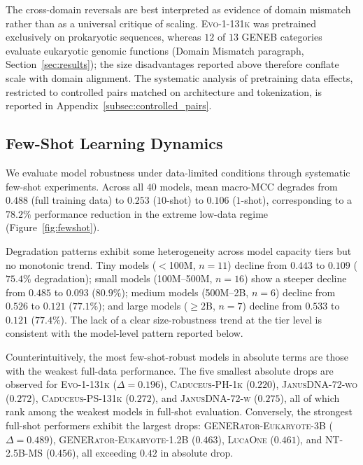\documentclass{article}
\theoremstyle{plain}
\theoremstyle{definition}
\theoremstyle{remark}
\begin{document}
The cross-domain reversals are best interpreted as evidence of
domain mismatch rather than as a universal critique of scaling.
\textsc{Evo-1-131k} was pretrained exclusively on prokaryotic
sequences, whereas $12$ of $13$ GENEB categories evaluate eukaryotic
genomic functions (Domain Mismatch paragraph,
Section~\ref{sec:results}); the size disadvantages reported above
therefore conflate scale with domain alignment. The systematic
analysis of pretraining data effects, restricted to controlled pairs
matched on architecture and tokenization, is reported in
Appendix~\ref{subsec:controlled_pairs}.

\subsection{Few-Shot Learning Dynamics}
\label{subsec:fewshot}

We evaluate model robustness under data-limited conditions through
systematic few-shot experiments. Across all $40$ models, mean
macro-MCC degrades from $0.488$ (full training data) to $0.253$
($10$-shot) to $0.106$ ($1$-shot), corresponding to a $78.2\%$
performance reduction in the extreme low-data regime
(Figure~\ref{fig:fewshot}).

Degradation patterns exhibit some heterogeneity across model capacity
tiers but no monotonic trend. Tiny models ($<$100M, $n=11$) decline
from $0.443$ to $0.109$ ($75.4\%$ degradation); small models
(100M--500M, $n=16$) show a steeper decline from $0.485$ to $0.093$
($80.9\%$); medium models (500M--2B, $n=6$) decline from $0.526$ to
$0.121$ ($77.1\%$); and large models ($\geq 2$B, $n=7$) decline from
$0.533$ to $0.121$ ($77.4\%$). The lack of a clear size-robustness
trend at the tier level is consistent with the model-level pattern
reported below.

Counterintuitively, the most few-shot-robust models in absolute terms
are those with the weakest full-data performance. The five smallest
absolute drops are observed for \textsc{Evo-1-131k}
($\Delta = 0.196$), \textsc{Caduceus-PH-1k} ($0.220$),
\textsc{JanusDNA-72-wo} ($0.272$), \textsc{Caduceus-PS-131k}
($0.272$), and \textsc{JanusDNA-72-w} ($0.275$), all of which rank
among the weakest models in full-shot evaluation. Conversely, the
strongest full-shot performers exhibit the largest drops:
\textsc{GENERator-Eukaryote-3B} ($\Delta = 0.489$),
\textsc{GENERator-Eukaryote-1.2B} ($0.463$), \textsc{LucaOne}
($0.461$), and \textsc{NT-2.5B-MS} ($0.456$), all exceeding $0.42$
in absolute drop.
\end{document}
